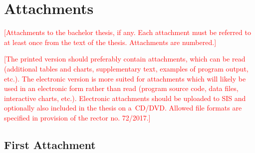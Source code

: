 \documentclass[12pt,a4paper]{report}
\let\openright=\clearpage
\def\XXX#1{\par\smallskip\noindent \textcolor{red}{[#1]}}
\begin{document}
\chapter{Attachments}
\XXX{Attachments to the bachelor thesis, if any. Each attachment must be referred to at least once from the text of the thesis. Attachments are numbered.}
\XXX{The printed version should preferably contain attachments, which can be read (additional tables and charts, supplementary text, examples of program output, etc.). The electronic version is more suited for attachments which will likely be used in an electronic form rather than read (program source code, data files, interactive charts, etc.). Electronic attachments should be uploaded to SIS and optionally also included in the thesis on a~CD/DVD. Allowed file formats are specified in provision of the rector no. 72/2017.}

\section{First Attachment}

\openright
\end{document}
